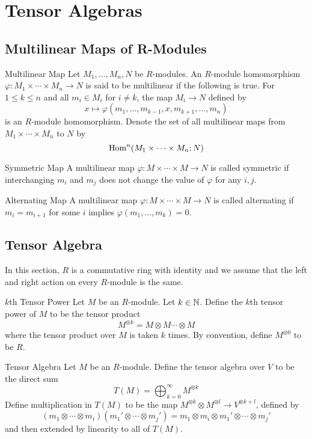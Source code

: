 \documentclass[a4paper]{article}
\begin{document}
\pagebreak
\section{Tensor Algebras}
\subsection{Multilinear Maps of R-Modules}
\begin{defn}{Multilinear Map}{} Let $M_1,\dots,M_n,N$ be $R$-modules. An $R$-module homomorphism $\varphi:M_1\times\cdots\times M_n\to N$ is said to be multilinear if the following is true. For $1\leq k\leq n$ and all $m_i\in M_i$ for $i\neq k$, the map $M_i\to N$ defined by $$x\mapsto\varphi(m_1,\dots,m_{k-1},x,m_{k+1},\dots,m_n)$$ is an $R$-module homomorphism. Denote the set of all multilinear maps from $M_1\times\cdots\times M_n$ to $N$ by $$\operatorname{Hom}^n(M_1\times\cdots\times M_n;N)$$
\end{defn}

\begin{defn}{Symmetric Map}{} A multilinear map $\varphi:M\times\cdots\times M\to N$ is called symmetric if interchanging $m_i$ and $m_j$ does not change the value of $\varphi$ for any $i,j$. 
\end{defn}

\begin{defn}{Alternating Map}{} A multilinear map $\varphi:M\times\cdots\times M\to N$ is called alternating if $m_i=m_{i+1}$ for some $i$ implies $\varphi(m_1,\dots,m_k)=0$. 
\end{defn}


\subsection{Tensor Algebra}
In this section, $R$ is a commutative ring with identity and we assume that the left and right action on every $R$-module is the same. 

\begin{defn}{$k$th Tensor Power}{} Let $M$ be an $R$-module. Let $k\in\mathbb{N}$. Define the $k$th tensor power of $M$ to be the tensor product $$M^{\otimes k}=M\otimes M\cdots\otimes M$$ where the tensor product over $M$ is taken $k$ times. By convention, define $M^{\otimes 0}$ to be $R$. 
\end{defn}

\begin{defn}{Tensor Algebra}{} Let $M$ be an $R$-module. Define the tensor algebra over $V$ to be the direct sum $$T(M)=\bigoplus_{k=0}^\infty M^{\otimes k}$$ Define multiplication in $T(M)$ to be the map $M^{\otimes k}\otimes M^{\otimes l}\to V^{\otimes k+l}$, defined by $$(m_1\otimes\cdots\otimes m_i)(m_1'\otimes\cdots\otimes m_j')=m_1\otimes m_i\otimes m_1'\otimes\cdots\otimes m_j'$$ and then extended by linearity to all of $T(M)$. 
\end{defn}
\end{document}
